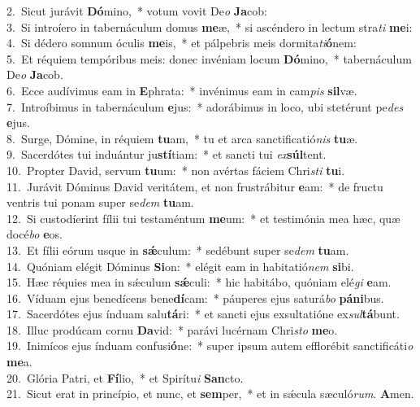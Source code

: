 {2.~}Sicut jurávit \textbf{Dó}mino,~* votum vovit De\textit{o} \textbf{Ja}cob:\\
{3.~}Si introíero in tabernáculum domus \textbf{me}æ,~* si ascéndero in lectum stra\textit{ti} \textbf{me}i:\\
{4.~}Si dédero somnum óculis \textbf{me}is,~* et pálpebris meis dormita\textit{ti}\textbf{ó}nem:\\
{5.~}Et réquiem tempóribus meis: donec invéniam locum \textbf{Dó}mino,~* tabernáculum De\textit{o} \textbf{Ja}cob.\\
{6.~}Ecce audívimus eam in \textbf{E}phrata:~* invénimus eam in cam\textit{pis} \textbf{sil}væ.\\
{7.~}Introíbimus in tabernáculum \textbf{e}jus:~* adorábimus in loco, ubi stetérunt pe\textit{des} \textbf{e}jus.\\
{8.~}Surge, Dómine, in réquiem \textbf{tu}am,~* tu et arca sanctificatió\textit{nis} \textbf{tu}æ.\\
{9.~}Sacerdótes tui induántur ju\textbf{stí}tiam:~* et sancti tui \textit{ex}\textbf{súl}tent.\\
{10.~}Propter David, servum \textbf{tu}um:~* non avértas fáciem Chri\textit{sti} \textbf{tu}i.\\
{11.~}Jurávit Dóminus David veritátem, et non frustrábitur \textbf{e}am:~* de fructu ventris tui ponam super se\textit{dem} \textbf{tu}am.\\
{12.~}Si custodíerint fílii tui testaméntum \textbf{me}um:~* et testimónia mea hæc, quæ docé\textit{bo} \textbf{e}os.\\
{13.~}Et fílii eórum usque in \textbf{sǽ}culum:~* sedébunt super se\textit{dem} \textbf{tu}am.\\
{14.~}Quóniam elégit Dóminus \textbf{Si}on:~* elégit eam in habitatió\textit{nem} \textbf{si}bi.\\
{15.~}Hæc réquies mea in sǽculum \textbf{sǽ}culi:~* hic habitábo, quóniam elé\textit{gi} \textbf{e}am.\\
{16.~}Víduam ejus benedícens bene\textbf{dí}cam:~* páuperes ejus saturá\textit{bo} \textbf{pá}\textbf{ni}bus.\\
{17.~}Sacerdótes ejus índuam salu\textbf{tá}ri:~* et sancti ejus exsultatióne ex\textit{sul}\textbf{tá}bunt.\\
{18.~}Illuc prodúcam cornu \textbf{Da}vid:~* parávi lucérnam Chri\textit{sto} \textbf{me}o.\\
{19.~}Inimícos ejus índuam confusi\textbf{ó}ne:~* super ipsum autem efflorébit sanctificáti\textit{o} \textbf{me}a.\\
{20.~}Glória Patri, et \textbf{Fí}lio,~* et Spirítu\textit{i} \textbf{San}cto.\\
{21.~}Sicut erat in princípio, et nunc, et \textbf{sem}per,~* et in sǽcula sæculó\textit{rum}. \textbf{A}men.\\
